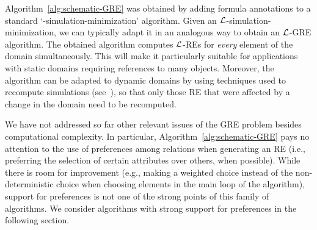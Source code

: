 Algorithm~\ref{alg:schematic-GRE} was obtained by adding formula annotations
to a standard `\EL-simulation-minimization' algorithm. Given an
$\mathcal{L}$-simulation-minimization, we can typically adapt it in an analogous
way to obtain an $\mathcal{L}$-GRE algorithm.
The obtained algorithm computes $\mathcal{L}$-REs for \emph{every} element of the
domain simultaneously.
This will make it particularly suitable for applications with
static domains requiring references to many objects.
 Moreover, the algorithm can be adapted
to dynamic domains by using techniques used to recompute simulations (see~\cite{saha:incre07}),
so that only those RE that were affected by a change in the domain need to be
recomputed.

We have not addressed so far other relevant issues of the
GRE problem besides computational complexity. In particular,
Algorithm~\ref{alg:schematic-GRE} pays no attention to the use of
preferences among relations when generating an RE (i.e., preferring
the selection of certain attributes over others, when possible).
While there is room for improvement (e.g., making a weighted choice
instead of the non-deterministic choice when choosing elements
in the main loop of the algorithm), support for preferences is not
one of the strong points of this family of algorithms.
We consider algorithms with strong support for preferences in the following section.
